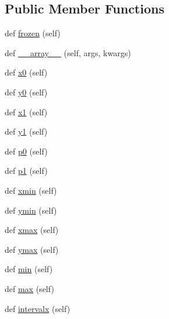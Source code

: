 \subsection*{Public Member Functions}
\begin{DoxyCompactItemize}
\item 
def \hyperlink{classmatplotlib_1_1transforms_1_1BboxBase_a444c43e79862ab71900f8bda988cc3cb}{frozen} (self)
\item 
def \hyperlink{classmatplotlib_1_1transforms_1_1BboxBase_a5c74dac673b5d4fe2f632b5d2bb49e74}{\+\_\+\+\_\+array\+\_\+\+\_\+} (self, args, kwargs)
\item 
def \hyperlink{classmatplotlib_1_1transforms_1_1BboxBase_a426599036a5f39ef257bab0ae084189f}{x0} (self)
\item 
def \hyperlink{classmatplotlib_1_1transforms_1_1BboxBase_a19dc90c8fe29252596fe6221eb2e272c}{y0} (self)
\item 
def \hyperlink{classmatplotlib_1_1transforms_1_1BboxBase_aedc05db4a446ed350213282d807cc8e5}{x1} (self)
\item 
def \hyperlink{classmatplotlib_1_1transforms_1_1BboxBase_a8e78484c0c5b6d158b3d2b538ae3b2fc}{y1} (self)
\item 
def \hyperlink{classmatplotlib_1_1transforms_1_1BboxBase_a7a1e5f642d7ef7fd73ba66e184bc14c3}{p0} (self)
\item 
def \hyperlink{classmatplotlib_1_1transforms_1_1BboxBase_a3bf4314c0bea6d32b502634dc0b298cf}{p1} (self)
\item 
def \hyperlink{classmatplotlib_1_1transforms_1_1BboxBase_a97453798574dd9b3a2bac353969c71a9}{xmin} (self)
\item 
def \hyperlink{classmatplotlib_1_1transforms_1_1BboxBase_ae709dcbfafe5e0ead4d41767b1a6b118}{ymin} (self)
\item 
def \hyperlink{classmatplotlib_1_1transforms_1_1BboxBase_a7045e130a04a0a9b7388dc51a9e6bff7}{xmax} (self)
\item 
def \hyperlink{classmatplotlib_1_1transforms_1_1BboxBase_a3c2ca856d20e2186e624fbee576e0b42}{ymax} (self)
\item 
def \hyperlink{classmatplotlib_1_1transforms_1_1BboxBase_a68fed28299d02712de3160422da7319c}{min} (self)
\item 
def \hyperlink{classmatplotlib_1_1transforms_1_1BboxBase_a078e2ca26297c684aea783584f81a595}{max} (self)
\item 
def \hyperlink{classmatplotlib_1_1transforms_1_1BboxBase_ab88bdc0cd4af576611fb50ee1295395a}{intervalx} (self)
\item 

\end{DoxyCompactItemize}
